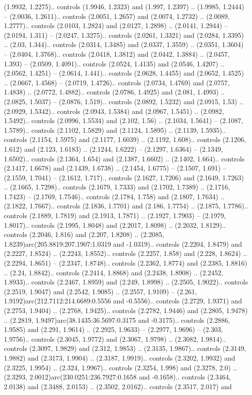 (1.9932, 1.2275).. controls (1.9946, 1.2323) and (1.997, 1.2397) .. (1.9985, 1.2444) -- (2.0036, 1.2611).. controls (2.0051, 1.2657) and (2.0074, 1.2732) .. (2.0089, 1.2777).. controls (2.0103, 1.2824) and (2.0127, 1.2898) .. (2.0141, 1.2944) -- (2.0194, 1.311) -- (2.0247, 1.3275).. controls (2.0261, 1.3321) and (2.0284, 1.3395) .. (2.03, 1.344).. controls (2.0314, 1.3485) and (2.0337, 1.3559) .. (2.0351, 1.3604) -- (2.0404, 1.3768).. controls (2.0418, 1.3812) and (2.0442, 1.3884) .. (2.0457, 1.393) -- (2.0509, 1.4091).. controls (2.0524, 1.4135) and (2.0546, 1.4207) .. (2.0562, 1.4251) -- (2.0614, 1.441).. controls (2.0628, 1.4455) and (2.0652, 1.4525) .. (2.0667, 1.4568) -- (2.0719, 1.4726).. controls (2.0734, 1.4769) and (2.0757, 1.4838) .. (2.0772, 1.4882).. controls (2.0786, 1.4925) and (2.081, 1.4993) .. (2.0825, 1.5037) -- (2.0876, 1.519).. controls (2.0892, 1.5232) and (2.0915, 1.53) .. (2.0929, 1.5342).. controls (2.0943, 1.5384) and (2.0967, 1.5451) .. (2.0982, 1.5492).. controls (2.0996, 1.5534) and (2.102, 1.56) .. (2.1034, 1.5641) -- (2.1087, 1.5789).. controls (2.1102, 1.5829) and (2.1124, 1.5895) .. (2.1139, 1.5935).. controls (2.1154, 1.5975) and (2.1177, 1.6039) .. (2.1192, 1.608).. controls (2.1206, 1.612) and (2.123, 1.6183) .. (2.1244, 1.6222) -- (2.1297, 1.6364) -- (2.1349, 1.6502).. controls (2.1364, 1.654) and (2.1387, 1.6602) .. (2.1402, 1.664).. controls (2.1417, 1.6678) and (2.1439, 1.6738) .. (2.1454, 1.6775) -- (2.1507, 1.691) -- (2.1559, 1.7041) -- (2.1612, 1.717).. controls (2.1627, 1.7206) and (2.1649, 1.7263) .. (2.1665, 1.7298).. controls (2.1679, 1.7333) and (2.1702, 1.7389) .. (2.1716, 1.7423) -- (2.1769, 1.7546).. controls (2.1784, 1.758) and (2.1807, 1.7634) .. (2.1822, 1.7667).. controls (2.1836, 1.7701) and (2.186, 1.7754) .. (2.1875, 1.7786).. controls (2.1889, 1.7819) and (2.1913, 1.7871) .. (2.1927, 1.7903) -- (2.1979, 1.8017).. controls (2.1995, 1.8048) and (2.2017, 1.8098) .. (2.2032, 1.8129).. controls (2.2046, 1.816) and (2.207, 1.8208) .. (2.2085, 1.8239)arc(205.8819:207.1907:1.0319 and -1.0319).. controls (2.2204, 1.8479) and (2.2227, 1.8524) .. (2.2243, 1.8552).. controls (2.2257, 1.858) and (2.228, 1.8624) .. (2.2294, 1.8651) -- (2.2347, 1.8748).. controls (2.2362, 1.8774) and (2.2385, 1.8816) .. (2.24, 1.8842).. controls (2.2414, 1.8868) and (2.2438, 1.8908) .. (2.2452, 1.8933).. controls (2.2467, 1.8959) and (2.249, 1.8998) .. (2.2505, 1.9022).. controls (2.2519, 1.9047) and (2.2542, 1.9085) .. (2.2557, 1.9109) -- (2.261, 1.9192)arc(212.7112:214.6689:0.5556 and -0.5556).. controls (2.2729, 1.9371) and (2.2753, 1.9404) .. (2.2768, 1.9425).. controls (2.2782, 1.9446) and (2.2805, 1.9478) .. (2.2819, 1.9497)arc(38.1435:36.5697:0.3175 and -0.3175).. controls (2.2886, 1.9585) and (2.291, 1.9614) .. (2.2925, 1.9633) -- (2.2977, 1.9696) -- (2.303, 1.9756).. controls (2.3045, 1.9772) and (2.3067, 1.9798) .. (2.3082, 1.9814).. controls (2.3097, 1.9829) and (2.312, 1.9853) .. (2.3135, 1.9867).. controls (2.3149, 1.9882) and (2.3173, 1.9904) .. (2.3187, 1.9919).. controls (2.3202, 1.9932) and (2.3225, 1.9954) .. (2.324, 1.9967).. controls (2.3254, 1.998) and (2.3278, 2.0) .. (2.3293, 2.0012)arc(230.0251:236.7927:0.1658 and -0.1658).. controls (2.3464, 2.0138) and (2.3488, 2.0153) .. (2.3502, 2.0162).. controls (2.3517, 2.017) and 